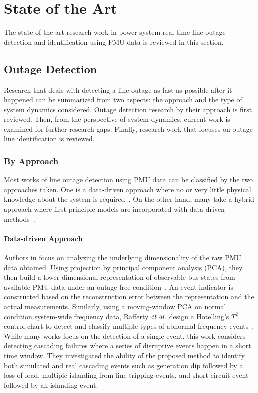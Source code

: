 \section{State of the Art}

The state-of-the-art research work in power system real-time line outage detection and identification using PMU data is reviewed in this section. 

\subsection{Outage Detection} %
\label{sub:outage_detection}

Research that deals with detecting a line outage as fast as possible after it happened can be summarized from two aspects: the approach and the type of system dynamics considered. Outage detection research by their approach is first reviewed. Then, from the perspective of system dynamics, current work is examined for further research gaps. Finally, research work that focuses on outage line identification is reviewed.

\subsubsection{By Approach} %
\label{ssub:by_approach}

Most works of line outage detection using PMU data can be classified by the two approaches taken. One is a data-driven approach where no or very little physical knowledge about the system is required~\cite{Xie2014, Rafferty2016, Hosur2019}. On the other hand, many take a hybrid approach where first-principle models are incorporated with data-driven methods~\cite{Jamei2016, Jamei2017a, ardakanian2017event, Ardakanian2019a, Tate2008, tate2009double, dai2020line,Chen2016, Rovatsos2017}. 

\paragraph{Data-driven Approach}
Authors in \cite{Xie2014} focus on analyzing the underlying dimensionality of the raw PMU data obtained. Using projection by principal component analysis (PCA), they then build a lower-dimensional representation of observable bus states from available PMU data under an outage-free condition~\cite{Xie2014}. An event indicator is constructed based on the reconstruction error between the representation and the actual measurements. 
Similarly, using a moving-window PCA on normal condition system-wide frequency data, Rafferty $\textit{et al}.$ design a Hotelling’s $T^2$ control chart to detect and classify multiple types of abnormal frequency events~\cite{Rafferty2016}. While many works focus on the detection of a single event, this work considers detecting cascading failures where a series of disruptive events happen in a short time window. They investigated the ability of the proposed method to identify both simulated and real cascading events such as generation dip followed by a loss of load, multiple islanding from line tripping events, and short circuit event followed by an islanding event.

